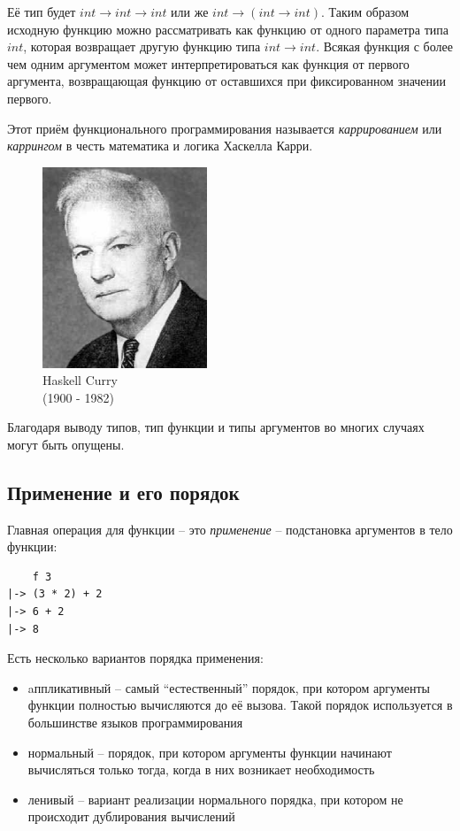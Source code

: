 \documentclass[a4paper,11pt]{article}
\begin{document}
Её тип будет $int \rightarrow int \rightarrow int$ или же $int \rightarrow (int 
\rightarrow int)$. Таким образом исходную функцию можно рассматривать как
функцию от одного параметра типа $int$, которая возвращает другую функцию
типа $int \rightarrow int$. Всякая функция с более чем одним аргументом 
может интерпретироваться как функция от первого аргумента, возвращающая функцию
от оставшихся при фиксированном значении первого. 

Этот приём функционального программирования называется \emph{каррированием} или
\emph{каррингом} в честь математика и логика Хаскелла Карри.

\begin{figure}[h]
    \begin{center}
        \includegraphics[height=60mm]{lecture1/curry.eps}
        \caption{Haskell Curry\\(1900 - 1982)}
    \end{center}
\end{figure}

Благодаря выводу типов, тип функции и типы аргументов во многих случаях могут
быть опущены.

\subsection{Применение и его порядок}

Главная операция для функции -- это \emph{применение} -- подстановка аргументов
в тело функции:
\begin{lstlisting}
    f 3
|-> (3 * 2) + 2
|-> 6 + 2
|-> 8
\end{lstlisting}

Есть несколько вариантов порядка применения:
\begin{itemize}
\item aппликативный -- самый ``естественный'' порядок, при котором аргументы
функции полностью вычисляются до её вызова. Такой порядок используется в
большинстве языков программирования
\item нормальный -- порядок, при котором аргументы функции начинают вычисляться
только тогда, когда в них возникает необходимость
\item ленивый -- вариант реализации нормального порядка, при котором не
происходит дублирования вычислений
\end{itemize}
\end{document}
